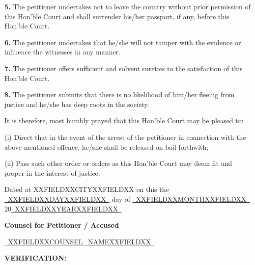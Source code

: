 \documentclass[12pt, a4paper]{article}
\newcommand{\fillline}[1]{\underline{~#1~}}
\begin{document}
\vspace{8pt}
\noindent \textbf{5.} The petitioner undertakes not to leave the country without prior permission of this Hon'ble Court and shall surrender his/her passport, if any, before this Hon'ble Court.

\vspace{8pt}
\noindent \textbf{6.} The petitioner undertakes that he/she will not tamper with the evidence or influence the witnesses in any manner.

\vspace{8pt}
\noindent \textbf{7.} The petitioner offers sufficient and solvent sureties to the satisfaction of this Hon'ble Court.

\vspace{8pt}
\noindent \textbf{8.} The petitioner submits that there is no likelihood of him/her fleeing from justice and he/she has deep roots in the society.

\vspace{12pt}
\noindent It is therefore, most humbly prayed that this Hon'ble Court may be pleased to:

\vspace{6pt}
\noindent (i) \quad Direct that in the event of the arrest of the petitioner in connection with the above mentioned offence, he/she shall be released on bail forthwith;

\vspace{6pt}
\noindent (ii) \quad Pass such other order or orders as this Hon'ble Court may deem fit and proper in the interest of justice.

\vspace{30pt}

\noindent Dated at XXFIELDXXCITYXXFIELDXX on this the \fillline{XXFIELDXXDAYXXFIELDXX} day of \fillline{XXFIELDXXMONTHXXFIELDXX} 20\fillline{XXFIELDXXYEARXXFIELDXX}

\vspace{30pt}

\noindent\hfill \textbf{Counsel for Petitioner / Accused}

\vspace{10pt}
\noindent\hfill \fillline{XXFIELDXXCOUNSEL_NAMEXXFIELDXX}

\vspace{20pt}

\noindent \textbf{VERIFICATION:}
\end{document}

